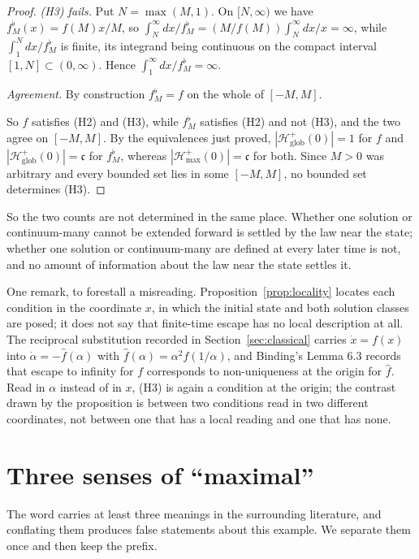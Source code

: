 \documentclass[12pt]{article}
\theoremstyle{plain}
\theoremstyle{definition}
\theoremstyle{remark}
\newcommand{\cont}{\mathfrak{c}}
\newcommand{\Hglob}{\mathcal{H}^{+}_{\mathrm{glob}}}
\newcommand{\Hmax}{\mathcal{H}^{+}_{\max}}
\begin{document}
\begin{proof}
\emph{\textup{(H3)} fails.} Put $N=\max(M,1)$. On $[N,\infty)$ we have
$f^{\flat}_{M}(x)=f(M)x/M$, so
$\int_{N}^{\infty}dx/f^{\flat}_{M}=(M/f(M))\int_{N}^{\infty}dx/x=\infty$, while
$\int_{1}^{N}dx/f^{\flat}_{M}$ is finite, its integrand being continuous on the
compact interval $[1,N]\subset(0,\infty)$. Hence
$\int_{1}^{\infty}dx/f^{\flat}_{M}=\infty$.

\emph{Agreement.} By construction $f^{\flat}_{M}=f$ on the whole of $[-M,M]$.

So $f$ satisfies (H2) and (H3), while $f^{\flat}_{M}$ satisfies (H2) and not
(H3), and the two agree on $[-M,M]$. By the equivalences just proved,
$|\Hglob(0)|=1$ for $f$ and $|\Hglob(0)|=\cont$ for $f^{\flat}_{M}$, whereas
$|\Hmax(0)|=\cont$ for both. Since $M>0$ was arbitrary and every bounded set
lies in some $[-M,M]$, no bounded set determines (H3).
\end{proof}

So the two counts are not determined in the same place. Whether one solution or
continuum-many cannot be extended forward is settled by the law near the state;
whether
one solution or continuum-many are defined at every later time is not, and no
amount of information about the law near the state settles it.

One remark, to forestall a misreading. Proposition~\ref{prop:locality} locates
each condition in the coordinate $x$, in which the initial state and both
solution classes are posed; it does not say that finite-time escape has no local
description at all. The reciprocal substitution recorded in
Section~\ref{sec:classical} carries $\dot x=f(x)$ into
$\dot\alpha=-\hat f(\alpha)$ with $\hat f(\alpha)=\alpha^{2}f(1/\alpha)$, and
Binding's Lemma 6.3 records that escape to infinity for $f$ corresponds to
non-uniqueness at the origin for $\hat f$. Read in $\alpha$ instead of in $x$,
(H3) is again a condition at the origin; the contrast drawn by the proposition
is between two conditions read in two different coordinates, not between one
that has a local reading and one that has none.

\section{Three senses of ``maximal''}\label{sec:senses}

The word carries at least three meanings in the surrounding literature, and
conflating them produces false statements about this example. We separate them
once and then keep the prefix.
\end{document}
